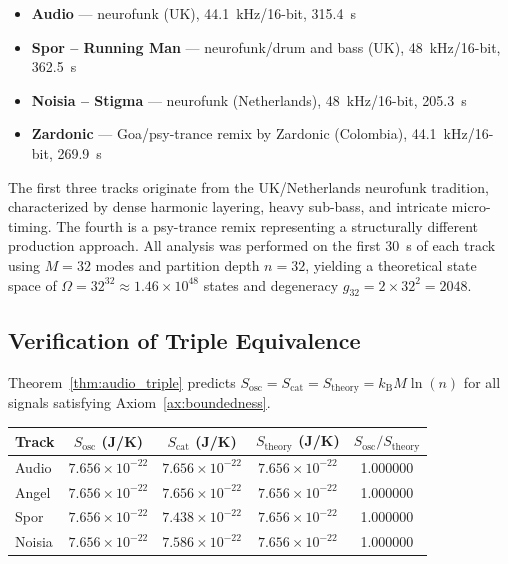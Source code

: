 \documentclass[twocolumn,10pt]{article}
\theoremstyle{remark}
\newcommand{\kB}{k_{\mathrm{B}}}
\begin{document}
\begin{itemize}
    \item \textbf{Audio} --- neurofunk (UK), 44.1~kHz/16-bit, 315.4~s
    \item \textbf{Spor -- Running Man} --- neurofunk/drum and bass (UK), 48~kHz/16-bit, 362.5~s
    \item \textbf{Noisia -- Stigma} --- neurofunk (Netherlands), 48~kHz/16-bit, 205.3~s
    \item \textbf{Zardonic} --- Goa/psy-trance remix by Zardonic (Colombia), 44.1~kHz/16-bit, 269.9~s
\end{itemize}

The first three tracks originate from the UK/Netherlands neurofunk tradition, characterized by dense harmonic layering, heavy sub-bass, and intricate micro-timing. The fourth is a psy-trance remix representing a structurally different production approach. All analysis was performed on the first 30~s of each track using $M = 32$ modes and partition depth $n = 32$, yielding a theoretical state space of $\Omega = 32^{32} \approx 1.46 \times 10^{48}$ states and degeneracy $g_{32} = 2 \times 32^2 = 2048$.

\subsection{Verification of Triple Equivalence}

Theorem~\ref{thm:audio_triple} predicts $S_{\mathrm{osc}} = S_{\mathrm{cat}} = S_{\mathrm{theory}} = \kB M \ln(n)$ for all signals satisfying Axiom~\ref{ax:boundedness}.

\begin{center}
\begin{tabular}{lcccc}
\toprule
Track & $S_{\mathrm{osc}}$ (J/K) & $S_{\mathrm{cat}}$ (J/K) & $S_{\mathrm{theory}}$ (J/K) & $S_{\mathrm{osc}}/S_{\mathrm{theory}}$ \\
\midrule
Audio     & $7.656 \times 10^{-22}$ & $7.656 \times 10^{-22}$ & $7.656 \times 10^{-22}$ & 1.000000 \\
Angel    & $7.656 \times 10^{-22}$ & $7.656 \times 10^{-22}$ & $7.656 \times 10^{-22}$ & 1.000000 \\
Spor            & $7.656 \times 10^{-22}$ & $7.438 \times 10^{-22}$ & $7.656 \times 10^{-22}$ & 1.000000 \\
Noisia          & $7.656 \times 10^{-22}$ & $7.586 \times 10^{-22}$ & $7.656 \times 10^{-22}$ & 1.000000 \\
\bottomrule
\end{tabular}
\end{center}
\end{document}
